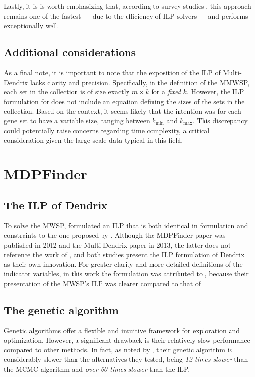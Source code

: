 Lastly, it is is worth emphasizing that, according to survey studies \cite{survey}, this approach remains one of the fastest --- due to the efficiency of ILP solvers --- and performs exceptionally well.

\subsection{Additional considerations}

As a final note, it is important to note that the exposition of the ILP of Multi-Dendrix lacks clarity and precision. Specifically, in the definition of the MMWSP, each set in the collection is of size exactly $m \times k$ for a \textit{fixed} $k$. However, the ILP formulation for does not include an equation defining the sizes of the sets in the collection. Based on the context, it seems likely that the intention was for each gene set to have a variable size, ranging between $k_\mathrm{min}$ and $k_\mathrm{max}$. This discrepancy could potentially raise concerns regarding time complexity, a critical consideration given the large-scale data typical in this field.

\section{MDPFinder}

\subsection{The ILP of Dendrix}

To solve the MWSP, \textcite{mdpfinder} formulated an ILP that is both identical in formulation and constraints to the one proposed by \textcite{multi-dendrix}. Although the MDPFinder paper was published in 2012 and the Multi-Dendrix paper in 2013, the latter does not reference the work of \textcite{mdpfinder}, and both studies present the ILP formulation of Dendrix as their own innovation. For greater clarity and more detailed definitions of the indicator variables, in this work the formulation was attributed to \textcite{multi-dendrix}, because their presentation of the MWSP's ILP was clearer compared to that of \textcite{mdpfinder}.

\subsection{The genetic algorithm}

Genetic algorithms offer a flexible and intuitive framework for exploration and optimization. However, a significant drawback is their relatively slow performance compared to other methods. In fact, as noted by \textcite{mdpfinder}, their genetic algorithm is considerably slower than the alternatives they tested, being \textit{12 times slower} than the MCMC algorithm and \textit{over 60 times slower} than the ILP.

